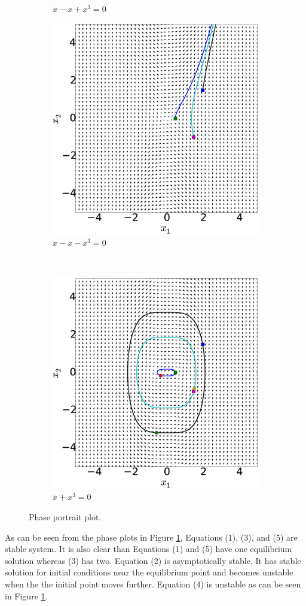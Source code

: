 \documentclass[14pt, a4paper]{extreport}
\begin{document}
\begin{figure}[H]
\begin{subfigure}[t]{7 cm}
        \caption{$\ddot{x} - x + x^3 = 0$}
    \end{subfigure}
    \quad
    \begin{subfigure}[t]{7 cm}
        \centering
        \includegraphics[height=7 cm]{figure/2D.eps}
        \caption{$\ddot{x} - x - x^3 = 0$}
    \end{subfigure}
    \\
    \begin{subfigure}[t]{7 cm}
        \centering
        \includegraphics[height=7 cm]{figure/2E.eps}
        \caption{$\ddot{x} + x^3 = 0$}
    \end{subfigure}
    \caption{Phase portrait plot.}
    \label{fig:phasePortrait}
\end{figure}
%
As can be seen from the phase plots in Figure \ref{fig:phasePortrait}, Equations (1), (3), and (5) are stable system. It is also clear than Equations (1) and (5) have one equilibrium solution whereas (3) has two. Equation (2) is asymptotically stable. It has stable solution for initial conditions near the equilibrium point and becomes unstable when the the initial point moves further. Equation (4) is unstable as can be seen in Figure \ref{fig:phasePortrait}.
\end{document}
